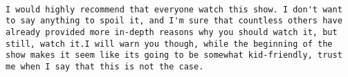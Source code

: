 \documentclass[
]{article}
\begin{document}
\begin{verbatim}
                                                                                                                                                                                                                                                                                                                                                                                                                                                                                                                                                                                                                                                                                                                                                                                                                                                                                                                                                                                                                                                                                                                                                                                                                                                                                                                                                       I would highly recommend that everyone watch this show. I don't want to say anything to spoil it, and I'm sure that countless others have already provided more in-depth reasons why you should watch it, but still, watch it.I will warn you though, while the beginning of the show makes it seem like its going to be somewhat kid-friendly, trust me when I say that this is not the case.

\end{verbatim}
\end{document}
